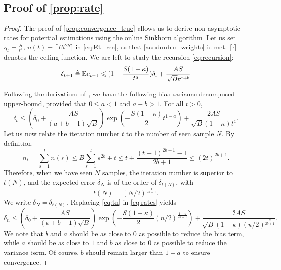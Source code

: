 \subsection{Proof of \autoref{prop:rate}}\label{app:proof_rate}

\begin{proof}
The proof of \autoref{prop:convergence_true} allows us to derive non-asymptotic rates for potential estimations using the online Sinkhorn algorithm. Let us set $\eta_t = \frac{S}{t^a}$, $n(t) = \lceil B t^{2b} \rceil$ in \eqref{eq:Et_rec}, so that \autoref{ass:double_weights} is met.
$\lceil \cdot \rceil$ denotes the ceiling function.
We are left to study the recursion \eqref{eq:recursion}:
\begin{equation}
    \delta_{t+1} \triangleq \mathbb{E} e_{t+1} \leqslant (1 - \frac{S(1 - \kappa)}{t^a}) \delta_t + 
    \frac{A S}{\sqrt{B}{t^{a + b}}}
\end{equation}

Following the derivations of \citet[Theorem 2]{moulines_non-asymptotic_2011}, we have the following
bias-variance decomposed upper-bound,
provided that $0 \leq a < 1$ and $a+ b > 1$. For all $t > 0$,
\begin{equation}\label{eq:rates}
    \delta_t \leq (\delta_0 + \frac{A S}{(a + b - 1)\sqrt{B}})
    \exp(- \frac{S(1 - \kappa)}{2} t^{1 - a})
    + \frac{2 A S}{\sqrt{B}(1 - \kappa) t^a}.
\end{equation}
Let us now relate the iteration number $t$ to the number of seen sample $N$. By definition
\begin{equation}
    n_t = \sum_{s=1}^t n(s) \leq B \sum_{s=1}^t s^{2b} + t \leq
     t + \frac{(t+1)^{2b + 1} - 1}{2b + 1}
     \leq (2t)^{2b+1}.
\end{equation}
Therefore, when we have seen $N$ samples, the iteration number is superior to $t(N)$, and the expected error $\delta_N$ is of the order of $\delta_{t(N)}$, with
\begin{equation}\label{eq:tn}
    t(N) =  {(N/2)}^{\frac{1}{2b + 1}}.
\end{equation}
We write $\delta_N = \delta_{t(N)}$. Replacing \eqref{eq:tn} in \eqref{eq:rates} yields
\begin{equation}\label{eq:non-asymptotic}
    \delta_n \leq 
    (\delta_0 + \frac{A S}{(a + b - 1)\sqrt{B}})
    \exp\left(- \frac{S(1 - \kappa)}{2} {(n /2)}^{\frac{1 - a}{2b+1}}\right)
    + \frac{2 A S}{\sqrt{B}(1 - \kappa) {(n/2)}^{\frac{a}{2b+1}}}.
\end{equation}
We note that $b$ and $a$ should be as close to $0$ as possible to reduce the bias term, while $a$
should be as close to $1$ and $b$ as close to $0$ as possible to reduce the variance
term. Of course, $b$ should remain larger than $1 - a$ to ensure convergence.


\end{proof}
